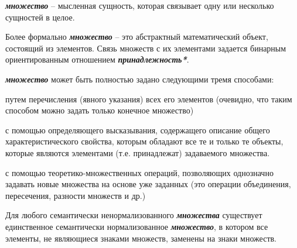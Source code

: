 \begin{SCn}
{\textbf{\textit{множество}} – мысленная сущность, которая связывает одну или несколько сущностей в целое.

Более формально \textbf{\textit{множество}} – это абстрактный математический объект, состоящий из элементов. Связь множеств с их элементами задается бинарным ориентированным отношением \textbf{\textit{принадлежность*}}.

\textbf{\textit{множество}} может быть полностью задано следующими тремя способами:
\begin{scnitemize}
    \item путем перечисления (явного указания) всех его элементов (очевидно, что таким способом можно задать только конечное множество)
    \item с помощью определяющего высказывания, содержащего описание общего характеристического свойства, которым обладают все те и только те объекты, которые являются элементами (т.е. принадлежат) задаваемого множества.
    \item с помощью теоретико-множественных операций, позволяющих однозначно задавать новые множества на основе уже заданных (это операции объединения, пересечения, разности множеств и др.)
\end{scnitemize}
Для любого семантически ненормализованного \textbf{\textit{множества}} существует единственное семантически нормализованное \textbf{\textit{множество}}, в котором все элементы, не являющиеся знаками множеств, заменены на знаки множеств.}





\end{SCn}
